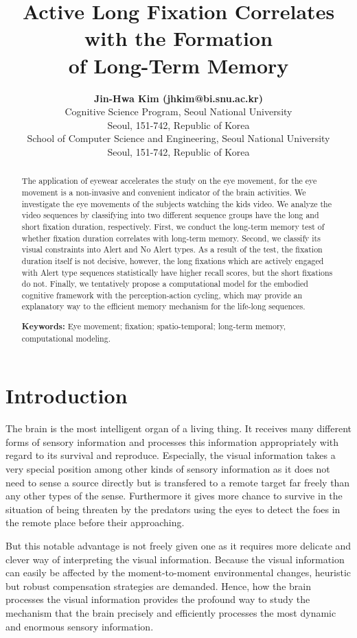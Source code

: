 \documentclass[10pt,letterpaper]{article}
\title{Active Long Fixation Correlates with the Formation \\
of Long-Term Memory}
\author{{\large \bf Jin-Hwa Kim (jhkim@bi.snu.ac.kr)} \\
  Cognitive Science Program, Seoul National University \\
  Seoul, 151-742, Republic of Korea
  \AND {\large \bf Byoung-Tak Zhang (btzhang@bi.snu.ac.kr)} \\
  School of Computer Science and Engineering, Seoul National University \\
  Seoul, 151-742, Republic of Korea}
\begin{document}
\maketitle

\begin{abstract}
The application of eyewear accelerates the study on the eye movement, for the eye movement is a non-invasive and convenient indicator of the brain activities. We investigate the eye movements of the subjects watching the kids video. We analyze the video sequences by classifying into two different sequence groups have the long and short fixation duration, respectively. First, we conduct the long-term memory test of whether fixation duration correlates with long-term memory. Second, we classify its visual constraints into Alert and No Alert types. As a result of the test, the fixation duration itself is not decisive, however, the long fixations which are actively engaged with Alert type sequences statistically have higher recall scores, but the short fixations do not. Finally, we tentatively propose a computational model for the embodied cognitive framework with the perception-action cycling, which may provide an explanatory way to the efficient memory mechanism for the life-long sequences.

\textbf{Keywords:} 
Eye movement; fixation; spatio-temporal; long-term memory, computational modeling.
\end{abstract}


\section{Introduction}

The brain is the most intelligent organ of a living thing. It receives many different forms of sensory information and processes this information appropriately with regard to its survival and reproduce. Especially, the visual information takes a very special position among other kinds of sensory information as it does not need to sense a source directly but is transfered to a remote target far freely than any other types of the sense. Furthermore it gives more chance to survive in the situation of being threaten by the predators using the eyes to detect the foes in the remote place before their approaching. 

But this notable advantage is not freely given one as it requires more delicate and clever way of interpreting the visual information. Because the visual information can easily be affected by the moment-to-moment environmental changes, heuristic but robust compensation strategies are demanded. Hence, how the brain processes the visual information provides the profound way to study the mechanism that the brain precisely and efficiently processes the most dynamic and enormous sensory information.
\end{document}
